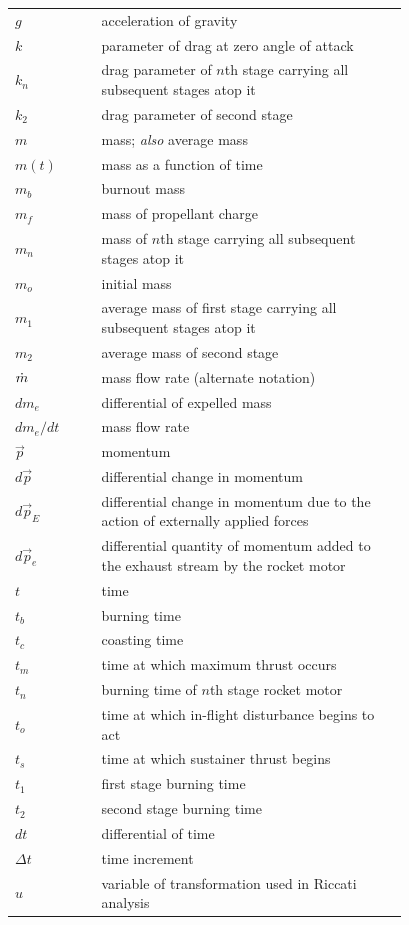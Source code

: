 \begin{longtable}{@{}l p{0.78\linewidth}@{}}
$g$ & acceleration of gravity \\
$k$ & parameter of drag at zero angle of attack \\
$k_n$ & drag parameter of $n$th stage carrying all subsequent stages atop it \\
$k_2$ & drag parameter of second stage \\
$m$ & mass; \emph{also} average mass \\
$m(t)$ & mass as a function of time \\
$m_b$ & burnout mass \\
$m_f$ & mass of propellant charge \\
$m_n$ & mass of $n$th stage carrying all subsequent stages atop it \\
$m_o$ & initial mass \\
$m_1$ & average mass of first stage carrying all subsequent stages atop it \\
$m_2$ & average mass of second stage \\
$\dot{m}$ & mass flow rate (alternate notation) \\
$dm_e$ & differential of expelled mass \\
$dm_e/dt$ & mass flow rate \\
$\vec{p}$ & momentum \\
$d\vec{p}$ & differential change in momentum \\
$d\vec{p}_E$ & differential change in momentum due to the action of externally applied forces \\
$d\vec{p}_e$ & differential quantity of momentum added to the exhaust stream by the rocket motor \\
$t$ & time \\
$t_b$ & burning time \\
$t_c$ & coasting time \\
$t_m$ & time at which maximum thrust occurs \\
$t_n$ & burning time of $n$th stage rocket motor \\
$t_o$ & time at which in-flight disturbance begins to act \\
$t_s$ & time at which sustainer thrust begins \\
$t_1$ & first stage burning time \\
$t_2$ & second stage burning time \\
$dt$ & differential of time \\
$\Delta t$ & time increment \\
$u$ & variable of transformation used in Riccati analysis \\

\end{longtable}
